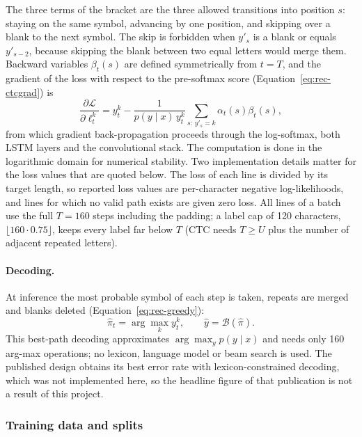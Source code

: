 The three terms of the bracket are the three allowed transitions into position $s$: staying on the same symbol, advancing by one position, and skipping over a blank to the next symbol.
The skip is forbidden when $y'_s$ is a blank or equals $y'_{s-2}$, because skipping the blank between two equal letters would merge them.
Backward variables $\beta_t(s)$ are defined symmetrically from $t=T$, and the gradient of the loss with respect to the pre-softmax score (Equation~\ref{eq:rec-ctcgrad}) is
\begin{equation}
\frac{\partial\mathcal L}{\partial\ell_t^{k}}=y_t^k-\frac{1}{p(y\mid x)\,y_t^k}\sum_{s:\,y'_s=k}\alpha_t(s)\beta_t(s),
\label{eq:rec-ctcgrad}
\end{equation}
from which gradient back-propagation proceeds through the log-softmax, both LSTM layers and the convolutional stack.
The computation is done in the logarithmic domain for numerical stability.
Two implementation details matter for the loss values that are quoted below.
The loss of each line is divided by its target length, so reported loss values are per-character negative log-likelihoods, and lines for which no valid path exists are given zero loss.
All lines of a batch use the full $T=160$ steps including the padding; a label cap of 120 characters, $\lfloor160\cdot0.75\rfloor$, keeps every label far below $T$ (CTC needs $T\ge U$ plus the number of adjacent repeated letters).


\paragraph{Decoding.}
At inference the most probable symbol of each step is taken, repeats are merged and blanks deleted (Equation~\ref{eq:rec-greedy}):
\begin{equation}
\hat\pi_t=\arg\max_k y_t^k,\qquad \hat y=\mathcal B(\hat\pi).
\label{eq:rec-greedy}
\end{equation}
This best-path decoding approximates $\arg\max_y p(y\mid x)$ and needs only 160 arg-max operations; no lexicon, language model or beam search is used.
The published design obtains its best error rate with lexicon-constrained decoding, which was not implemented here, so the headline figure of that publication is not a result of this project.

\subsubsection{Training data and splits}

